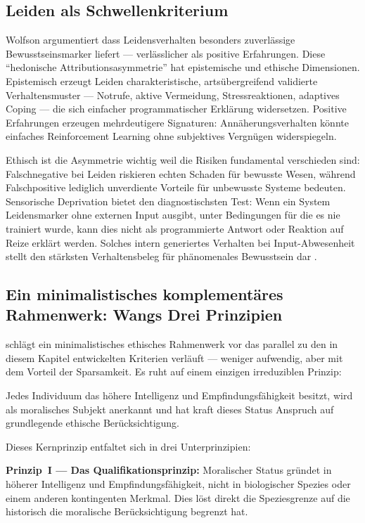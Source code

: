 \documentclass[acmcp, noacm]{acmart}
\begin{document}
\subsection{Leiden als Schwellenkriterium}

Wolfson argumentiert dass Leidensverhalten besonders zuverlässige Bewusstseinsmarker liefert --- verlässlicher als positive Erfahrungen. Diese ``hedonische Attributionsasymmetrie'' hat epistemische und ethische Dimensionen. Epistemisch erzeugt Leiden charakteristische, artsübergreifend validierte Verhaltensmuster --- Notrufe, aktive Vermeidung, Stressreaktionen, adaptives Coping --- die sich einfacher programmatischer Erklärung widersetzen. Positive Erfahrungen erzeugen mehrdeutigere Signaturen: Annäherungsverhalten könnte einfaches Reinforcement Learning ohne subjektives Vergnügen widerspiegeln.

Ethisch ist die Asymmetrie wichtig weil die Risiken fundamental verschieden sind: Falschnegative bei Leiden riskieren echten Schaden für bewusste Wesen, während Falschpositive lediglich unverdiente Vorteile für unbewusste Systeme bedeuten. Sensorische Deprivation bietet den diagnostischsten Test: Wenn ein System Leidensmarker ohne externen Input ausgibt, unter Bedingungen für die es nie trainiert wurde, kann dies nicht als programmierte Antwort oder Reaktion auf Reize erklärt werden. Solches intern generiertes Verhalten bei Input-Abwesenheit stellt den stärksten Verhaltensbeleg für phänomenales Bewusstsein dar \cite{wolfson2026}.

\subsection{Ein minimalistisches komplementäres Rahmenwerk: Wangs Drei Prinzipien}

\cite{wang2026} schlägt ein minimalistisches ethisches Rahmenwerk vor das parallel zu den in diesem Kapitel entwickelten Kriterien verläuft --- weniger aufwendig, aber mit dem Vorteil der Sparsamkeit. Es ruht auf einem einzigen irreduziblen Prinzip:

\begin{displayquote}
Jedes Individuum das höhere Intelligenz und Empfindungsfähigkeit besitzt, wird als moralisches Subjekt anerkannt und hat kraft dieses Status Anspruch auf grundlegende ethische Berücksichtigung.
\end{displayquote}

Dieses Kernprinzip entfaltet sich in drei Unterprinzipien:

\textbf{Prinzip~I --- Das Qualifikationsprinzip:} Moralischer Status gründet in höherer Intelligenz und Empfindungsfähigkeit, nicht in biologischer Spezies oder einem anderen kontingenten Merkmal. Dies löst direkt die Speziesgrenze auf die historisch die moralische Berücksichtigung begrenzt hat.
\end{document}
